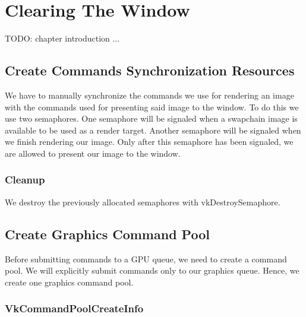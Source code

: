 \chapter{Clearing The Window}

TODO: chapter introduction ...

\section{Create Commands Synchronization Resources}

We have to manually synchronize the commands we use for rendering an image
with the commands used for presenting said image to the window.
To do this we use two semaphores.
One semaphore will be signaled when a swapchain image is available to
be used as a render target.
Another semaphore will be signaled when we finish rendering our image.
Only after this semaphore has been signaled, we are allowed to present our
image to the window.

\begin{minipage}{\linewidth}{\noindent}
    
\end{minipage}

\subsection{Cleanup}

We destroy the previously allocated semaphores with vkDestroySemaphore.

\section{Create Graphics Command Pool}

Before submitting commands to a GPU queue, we need to create a command pool.
We will explicitly submit commands only to our graphics queue.
Hence, we create one graphics command pool.

\begin{minipage}{\linewidth}{\noindent}
    
\end{minipage}

\subsection{VkCommandPoolCreateInfo}

